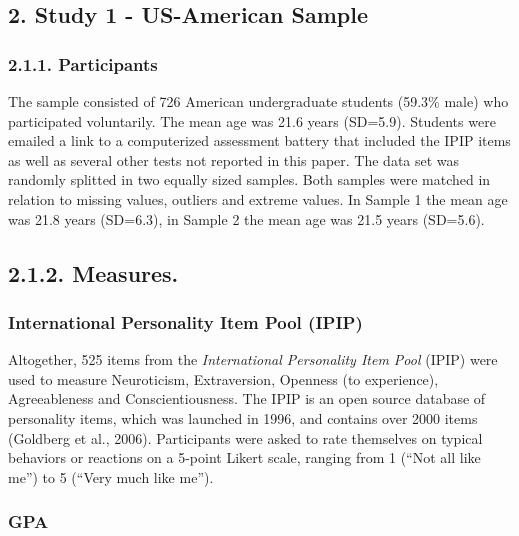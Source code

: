 \documentclass[,man,floatsintext]{apa6}
\theoremstyle{definition}
\theoremstyle{definition}
\theoremstyle{definition}
\theoremstyle{remark}
\begin{document}
\hypertarget{study-1---us-american-sample}{%
\subsection{2. Study 1 - US-American
Sample}\label{study-1---us-american-sample}}

\hypertarget{participants}{%
\subsubsection{2.1.1. Participants}\label{participants}}

The sample consisted of 726 American undergraduate students (59.3\%
male) who participated voluntarily. The mean age was 21.6 years
(SD=5.9). Students were emailed a link to a computerized assessment
battery that included the IPIP items as well as several other tests not
reported in this paper. The data set was randomly splitted in two
equally sized samples. Both samples were matched in relation to missing
values, outliers and extreme values. In Sample 1 the mean age was 21.8
years (SD=6.3), in Sample 2 the mean age was 21.5 years (SD=5.6).

\hypertarget{measures.}{%
\subsection{2.1.2. Measures.}\label{measures.}}

\hypertarget{international-personality-item-pool-ipip}{%
\subsubsection{International Personality Item Pool
(IPIP)}\label{international-personality-item-pool-ipip}}

Altogether, 525 items from the \emph{International Personality Item
Pool} (IPIP) were used to measure Neuroticism, Extraversion, Openness
(to experience), Agreeableness and Conscientiousness. The IPIP is an
open source database of personality items, which was launched in 1996,
and contains over 2000 items (Goldberg et al., 2006). Participants were
asked to rate themselves on typical behaviors or reactions on a 5-point
Likert scale, ranging from 1 (\enquote{Not all like me}) to 5
(\enquote{Very much like me}).

\hypertarget{gpa}{%
\subsubsection{GPA}\label{gpa}}
\end{document}
